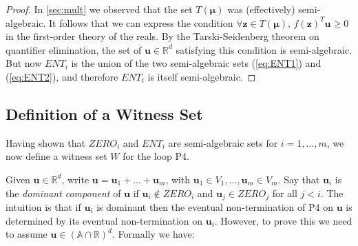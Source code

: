 \begin{proof}
In \cref{sec:mult} we observed that the set
$T(\boldsymbol{\mu})$ was (effectively) semi-algebraic.  It follows
that we can express the condition $\forall \boldsymbol{z}\in
T(\boldsymbol{\mu}),\, f(\boldsymbol{z})^T\boldsymbol{u}\geq 0$ in the
first-order theory of the reals.  By the Tarski-Seidenberg theorem
\cite{Tar51} on quantifier elimination, the set of $\boldsymbol{u}\in
\mathbb{R}^d$ satisfying this condition is semi-algebraic.  But now
$\mathit{ENT}_i$ is the union of the two semi-algebraic sets
(\ref{eq:ENT1}) and (\ref{eq:ENT2}), and therefore $\mathit{ENT}_i$ is
itself semi-algebraic.
\end{proof}
\subsection{Definition of a Witness Set}
Having shown that $\mathit{ZERO}_i$ and $\mathit{ENT}_i$ are
semi-algebraic sets for $i=1,\ldots,m$, we now define a witness set
$W$ for the loop \textsf{P4}.

Given $\boldsymbol{u} \in \mathbb{R}^d$, write $\boldsymbol{u}=
\boldsymbol{u}_1+\ldots+\boldsymbol{u}_m$, with $\boldsymbol{u}_1 \in
V_1,\ldots,\boldsymbol{u}_m\in V_m$.  Say that $\boldsymbol{u}_i$ is
the \emph{dominant component} of $\boldsymbol{u}$ if
$\boldsymbol{u}_i\not\in \mathit{ZERO}_i$ and
$\boldsymbol{u}_j\in\mathit{ZERO}_j$ for all $j<i$.  The intuition is
that if $\boldsymbol{u}_i$ is dominant then the eventual
non-termination of \textsf{P4} on $\boldsymbol{u}$ is determined by
its eventual non-termination on $\boldsymbol{u}_i$.  However, to prove
this we need to assume $\boldsymbol{u}\in (\mathbb{A}\cap\mathbb{R})^d$.  Formally we
have:

